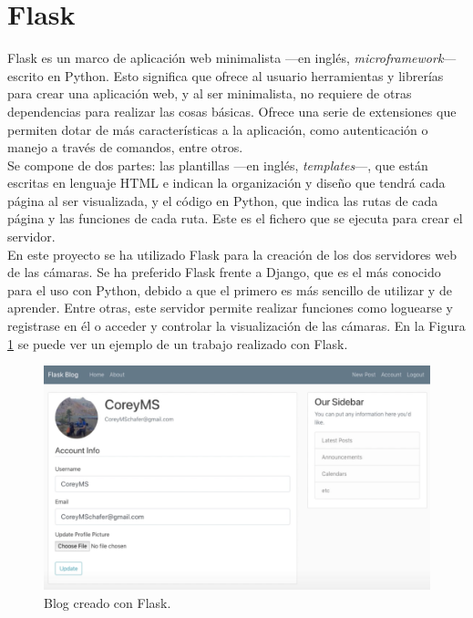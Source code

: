 \section{Flask}
\label{sec:flask}
Flask es un marco de aplicación web minimalista ---en inglés, \textit{microframework}--- escrito en Python. Esto significa que ofrece al usuario herramientas y librerías para crear una aplicación web, y al ser minimalista, no requiere de otras dependencias para realizar las cosas básicas. Ofrece una serie de extensiones que permiten dotar de más características a la aplicación, como autenticación o manejo a través de comandos, entre otros.\\

Se compone de dos partes: las plantillas ---en inglés, \textit{templates}---, que están escritas en lenguaje HTML e indican la organización y diseño que tendrá cada página al ser visualizada, y el código en Python, que indica las rutas de cada página y las funciones de cada ruta. Este es el fichero que se ejecuta para crear el servidor.\\

En este proyecto se ha utilizado Flask para la creación de los dos servidores web de las cámaras. Se ha preferido Flask frente a Django, que es el más conocido para el uso con Python, debido a que el primero es más sencillo de utilizar y de aprender. Entre otras, este servidor permite realizar funciones como loguearse y registrase en él o acceder y controlar la visualización de las cámaras. En la Figura \ref{fig:flask-internet} se puede ver un ejemplo de un trabajo realizado con Flask.\\
\begin{figure} [h!]
  \begin{center}
    \includegraphics[width=15cm]{figs/flask-internet}
  \end{center}
  \caption{Blog creado con Flask.}
  \label{fig:flask-internet}
\end{figure}

